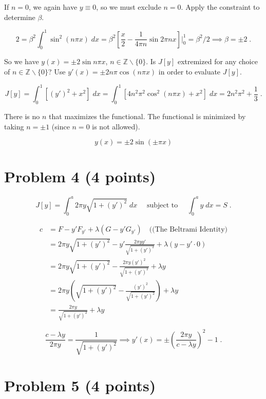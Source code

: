 \documentclass[a4paper]{article}
\begin{document}
If $n = 0$, we again have $y \equiv 0$, so we must exclude $n = 0$. Apply the constraint to determine $\beta$.

$$2 = \beta^2\int_0^1 \sin^2(n \pi x) \; dx = \beta^2\left[\frac{x}{2} - \frac{1}{4\pi n} \sin 2\pi n x \right]\biggr\rvert_0^1  = \beta^2 / 2 \implies \beta = \pm 2 \;.$$

So we have $y(x) = \pm 2 \sin n \pi x$, $n \in \mathbb{Z} \backslash \{0\}$. Is $J[y]$ extremized for any choice of $n \in \mathbb{Z} \backslash \{0\}$? Use $y'(x) = \pm 2 n \pi \cos (n \pi x)$ in order to evaluate $J[y]$.

$$J[y] = \int_0^1 \left[ (y')^2 + x^2 \right] \; dx = \int_0^1 \left[ 4 n^2 \pi^2 \cos^2(n \pi x) + x^2 \right] \; dx = 2n^2 \pi^2 + \frac{1}{3}\;.$$

There is no $n$ that maximizes the functional. The functional is minimized by taking $n = \pm 1$ (since $n = 0$ is not allowed). 

$$\boxed{ y(x) = \pm 2 \sin (\pm \pi x) } $$

\newpage

\section*{Problem 4 (4 points)}

$$ J[y] = \int_0^a 2\pi y \sqrt{1 + (y')^2} \; dx \quad \text{ subject to } \quad \int_0^a y \; dx = S \;. $$

\begin{align*}
c &= F - y'F_{y'} + \lambda (G - y'G_{y'}) \quad (\text{(The Beltrami Identity)}\\
&= 2\pi y \sqrt{1 + (y')^2} - y'\frac{2\pi y y'}{\sqrt{1+(y')^2}} + \lambda (y - y' \cdot 0) \\
&= 2\pi y \sqrt{1 + (y')^2} - \frac{2\pi y (y')^2}{\sqrt{1+(y')^2}} + \lambda y \\
&= 2 \pi y \left(\sqrt{1 + (y')^2} - \frac{(y')^2}{\sqrt{1 + (y')^2}}\right) + \lambda y \\
&= \frac{2\pi y}{\sqrt{1 + (y')^2}} + \lambda y 
\end{align*}

$$ \frac{c-\lambda y}{2 \pi y} = \frac{1}{\sqrt{1 + (y')^2}} \implies 
\boxed{y'(x) = \pm  \left(\frac{2\pi y}{c-\lambda y}\right)^2 - 1} \;.$$

\newpage

\section*{Problem 5 (4 points)}
\end{document}
